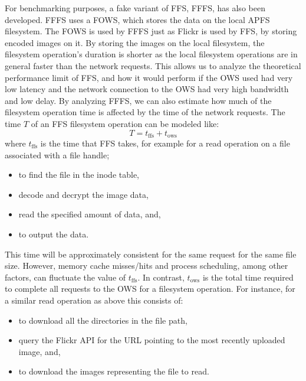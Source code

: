For benchmarking purposes, a fake variant of \gls{FFS}, \gls{FFFS}, has also been developed. \gls{FFFS} uses a \gls{FOWS}, which stores the data on the local \gls{APFS} filesystem. The \gls{FOWS} is used by \gls{FFFS} just as Flickr is used by \gls{FFS}, by storing encoded images on it. By storing the images on the local filesystem, the filesystem operation's duration is shorter as the local filesystem operations are in general faster than the network requests. This allows us to analyze the theoretical performance limit of \gls{FFS}, and how it would perform if the \gls{OWS} used had very low latency and the network connection to the \gls{OWS} had very high bandwidth and low delay. By analyzing \gls{FFFS}, we can also estimate how much of the filesystem operation time is affected by the time of the network requests. The time $T$ of an \gls{FFS} filesystem operation can be modeled like:
$$
	T = t_\text{ffs} + t_\text{ows}
$$
where $t_\text{ffs}$ is the time that \gls{FFS} takes, for example for a read operation on a file associated with a file handle;
\begin{itemize}
	\item to find the file in the inode table,
	\item decode and decrypt the image data,
	\item read the specified amount of data, and,
	\item to output the data.
\end{itemize}
This time will be approximately consistent for the same request for the same file size. However, memory cache misses/hits and process scheduling, among other factors, can fluctuate the value of $t_\text{ffs}$. In contrast, $t_\text{ows}$ is the total time required to complete all requests to the \gls{OWS} for a filesystem operation. For instance, for a similar read operation as above this consists of:
\begin{itemize}
	\item to download all the directories in the file path,
	\item query the Flickr \gls{API} for the URL pointing to the most recently uploaded image, and,
	\item to download the images representing the file to read.
\end{itemize}
